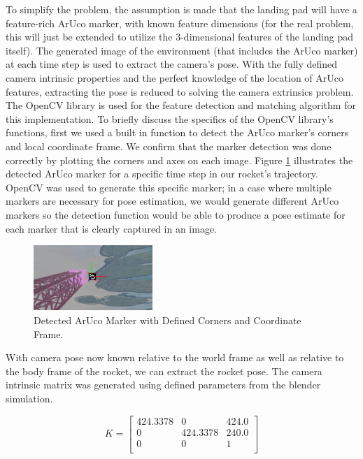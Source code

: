 \documentclass[conference]{IEEEtran}
\begin{document}
To simplify the problem, the assumption is made that the landing pad will have a feature-rich ArUco marker, with known feature dimensions (for the real problem, this will just be extended to utilize the 3-dimensional features of the landing pad itself). 
The generated image of the environment (that includes the ArUco marker) at each time step is used to extract the camera's pose. 
With the fully defined camera intrinsic properties and the perfect knowledge of the location of ArUco features, extracting the pose is reduced to solving the camera extrinsics problem. 
The OpenCV library is used for the feature detection and matching algorithm for this implementation.
To briefly discuss the specifics of the OpenCV library's functions, first we used a built in function to detect the ArUco marker's corners and local coordinate frame. 
We confirm that the marker detection was done correctly by plotting the corners and axes on each image. 
Figure \ref{fig:marker_} illustrates the detected ArUco marker for a specific time step in our rocket's trajectory. OpenCV was used to generate this specific marker; in a case where multiple markers are necessary for pose estimation, we would generate different ArUco markers so the detection function would be able to produce a pose estimate for each marker that is clearly captured in an image.

\begin{figure}[ht!] 
    \centerline{\includegraphics[width=0.4\textwidth]{detectedMarker.png}}
    \caption{Detected ArUco Marker with Defined Corners and Coordinate Frame.}
    \label{fig:marker_}
\end{figure}

With camera pose now known relative to the world frame as well as relative to the body frame of the rocket, we can extract the rocket pose. 
The camera intrinsic matrix was generated using defined parameters from the blender simulation.

\[
K = \begin{bmatrix}
424.3378 & 0 & 424.0 \\
0 & 424.3378 & 240.0 \\
0 & 0 & 1 \\
\end{bmatrix}
\]
\end{document}
